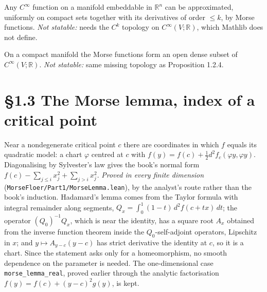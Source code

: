 \begin{proposition}[Proposition 1.2.4]
  \label{prop:1.2.4}
  \notready
  Any $C^\infty$ function on a manifold embeddable in $\mathbb{R}^n$ can be
  approximated, uniformly on compact sets together with its derivatives of order
  $\le k$, by Morse functions.
  \emph{Not statable:} needs the $C^k$ topology on $C^\infty(V;\mathbb{R})$,
  which Mathlib does not define.
\end{proposition}

\begin{theorem}[Theorem 1.2.5]
  \label{thm:1.2.5}
  \notready
  On a compact manifold the Morse functions form an open dense subset of
  $C^\infty(V;\mathbb{R})$.
  \emph{Not statable:} same missing topology as Proposition 1.2.4.
\end{theorem}

\section{\S1.3 The Morse lemma, index of a critical point}

\begin{theorem}
  \label{thm:1.3.1}
  \leanok
  Near a nondegenerate critical point $c$ there are coordinates in which $f$
  equals its quadratic model: a chart $\varphi$ centred at $c$ with
  $f(y) = f(c) + \tfrac12 d^2f_c(\varphi y, \varphi y)$.  Diagonalising by
  Sylvester's law gives the book's normal form
  $f(c) - \sum_{j\le i} x_j^2 + \sum_{j>i} x_j^2$.
  \emph{Proved in every finite dimension}
  (\texttt{MorseFloer/Part1/MorseLemma.lean}), by the analyst's route rather
  than the book's induction.  Hadamard's lemma comes from the Taylor formula
  with integral remainder along segments, $Q_x = \int_0^1 (1-t)\,
  d^2f(c+tx)\,dt$; the operator $(Q_0)^{-1}Q_x$, which is near the identity, has
  a square root $A_x$ obtained from the inverse function theorem inside the
  $Q_0$-self-adjoint operators, Lipschitz in $x$; and $y \mapsto A_{y-c}(y-c)$
  has strict derivative the identity at $c$, so it is a chart.  Since the
  statement asks only for a homeomorphism, no smooth dependence on the
  parameter is needed.  The one-dimensional case \texttt{morse\_lemma\_real},
  proved earlier through the analytic factorisation
  $f(y) = f(c) + (y-c)^2 g(y)$, is kept.
\end{theorem}

